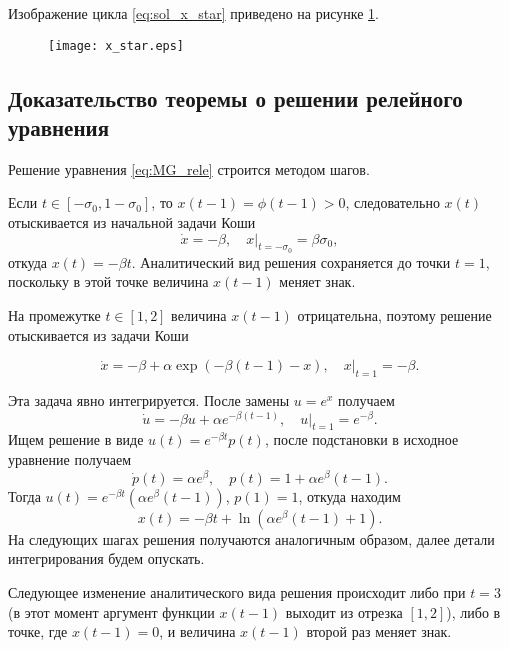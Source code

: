 Изображение цикла \eqref{eq:sol_x_star} приведено на рисунке \ref{fig:x_star:ch1}.

\begin{figure}
\centering
  \texttt{[image: x\_star.eps]}
  \label{fig:x_star:ch1}
\end{figure}


\subsection{Доказательство теоремы о решении релейного уравнения}

Решение уравнения \eqref{eq:MG_rele} строится методом шагов.

Если $t \in [-\sigma_0, 1 - \sigma_0]$, то $x(t - 1) = \phi(t - 1) > 0$, следовательно $x(t)$ отыскивается из начальной задачи Коши
\begin{equation}
    \dot{x} = -\beta, \quad x|_{t = -\sigma_0} = \beta \sigma_0,
\end{equation}
откуда $x(t) = -\beta t$. Аналитический вид решения сохраняется до точки $t = 1$, поскольку в этой точке величина $x(t - 1)$ меняет знак.

На промежутке $t \in [1, 2]$ величина $x(t - 1)$ отрицательна, поэтому решение отыскивается из задачи Коши

\begin{equation}
    \dot{x} = -\beta + \alpha\exp(-\beta(t - 1) - x), \quad x|_{t = 1} = -\beta.
\end{equation}

Эта задача явно интегрируется. После замены $u = e^x$ получаем
\begin{equation*}
	\dot{u} = -\beta u + \alpha e^{-\beta (t - 1)}, \quad u|_{t = 1} = e^{-\beta}.
\end{equation*}
Ищем решение в виде $u(t) = e^{-\beta t} p(t)$, после подстановки в исходное уравнение получаем
\[
\dot{p}(t) = \alpha e^{\beta}, \quad p(t) = 1 + \alpha e^{\beta} (t - 1).
\]
Тогда $u(t) = e^{-\beta t} (\alpha e^{\beta} (t - 1))$, $p(1) = 1$, откуда находим
\begin{equation}
\label{eq:solution_step1:ch1}
    x(t) = -\beta t +\ln(\alpha e^{\beta}(t - 1) + 1).
\end{equation}
%
На следующих шагах решения получаются аналогичным образом, далее детали интегрирования будем опускать.

Следующее изменение аналитического вида решения происходит либо при $t = 3$ (в этот момент аргумент функции $x(t - 1)$ выходит из отрезка $[1, 2]$), либо в точке, где $x(t - 1) = 0$, и величина $x(t - 1)$ второй раз меняет знак.

